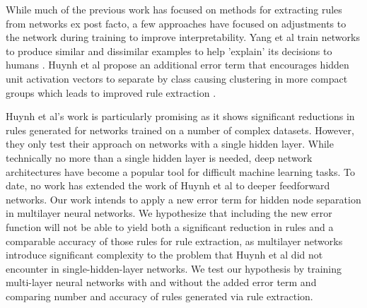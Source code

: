 While much of the previous work has focused on methods for extracting rules from
networks ex post facto, a few approaches have focused on adjustments to the network
during training to improve interpretability. Yang et al
train networks to produce similar and dissimilar examples to help
'explain' its decisions to humans \cite{yang2017explainable}.
Huynh et al propose
an additional error term that encourages hidden unit activation vectors
to separate by class causing clustering in more compact groups
which leads to improved rule extraction \cite{thuan11}.

Huynh et al's work is particularly promising as it shows significant reductions in
rules generated for networks trained on a number of complex datasets.
However, they only test their approach on networks with a single hidden
layer. While technically no more than a single hidden layer is needed, deep
network architectures have become a popular tool for difficult machine learning
tasks. To date, no work has extended
the work of Huynh et al to deeper feedforward networks.
Our work intends to apply a new error term for hidden node separation
in multilayer neural networks. We hypothesize that including the new error
function will not be able to yield both a significant reduction in rules
and a comparable accuracy of those rules for rule extraction, as multilayer
networks introduce significant complexity to the problem that Huynh et al
did not encounter in single-hidden-layer networks.
We test our hypothesis by training multi-layer neural networks
with and without the added error term and comparing number and accuracy
of rules generated via rule extraction.

